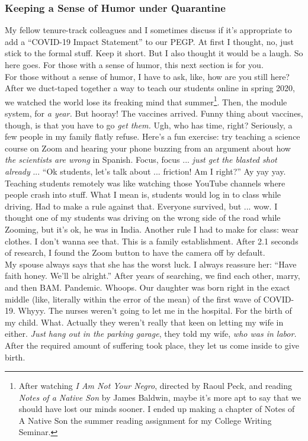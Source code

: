 \documentclass[../../main.tex]{subfiles}
\begin{document}
\subsubsection{Keeping a Sense of Humor under Quarantine}

My fellow tenure-track colleagues and I sometimes discuss if it's appropriate to add a ``COVID-19 Impact Statement'' to our PEGP.  At first I thought, no, just stick to the formal stuff.  Keep it short.  But I also thought it would be a laugh.  So here goes.  For those with a sense of humor, this next section is for you.  
\\
\vspace{0.25cm}
For those without a sense of humor, I have to ask, like, how are you still here?  After we duct-taped together a way to teach our students online in spring 2020, we watched the world lose its freaking mind that summer\footnote{After watching \textit{I Am Not Your Negro}, directed by Raoul Peck, and reading \textit{Notes of a Native Son} by James Baldwin, maybe it's more apt to say that we should have lost our minds sooner. I ended up making a chapter of Notes of A Native Son the summer reading assignment for my College Writing Seminar.}.  Then, the module system, for \textit{a year.}  But hooray!  The vaccines arrived.  Funny thing about vaccines, though, is that you have to go \textit{get them.}  Ugh, who has time, right?  Seriously, a few people in my family flatly refuse.  Here's a fun exercise: try teaching a science course on Zoom and hearing your phone buzzing from an argument about how \textit{the scientists are wrong} in Spanish.  Focus, focus ... \textit{just get the blasted shot already} ... ``Ok students, let's talk about ... friction!  Am I right?''  Ay yay yay.
\\
\vspace{0.25cm}
Teaching students remotely was like watching those YouTube channels where people crash into stuff.  What I mean is, students would log in to class while driving.  Had to make a rule against that.  Everyone survived, but ... wow.  I thought one of my students was driving on the wrong side of the road while Zooming, but it's ok, he was in India.  Another rule I had to make for class: wear clothes.  I don't wanna see that.  This is a family establishment.  After 2.1 seconds of research, I found the Zoom button to have the camera off by default.
\\
\vspace{0.25cm}
My spouse always says that she has the worst luck.  I always reassure her: ``Have faith honey.  We'll be alright.''  After years of searching, we find each other, marry, and then BAM.  Pandemic.  Whoops.  Our daughter was born right in the exact middle (like, literally within the error of the mean) of the first wave of COVID-19.  Whyyy.  The nurses weren't going to let me in the hospital.  For the birth of my child.  What.  Actually they weren't really that keen on letting my wife in either.  \textit{Just hang out in the parking garage}, they told my wife, \textit{who was in labor.}  After the required amount of suffering took place, they let us come inside to give birth.
\end{document}
